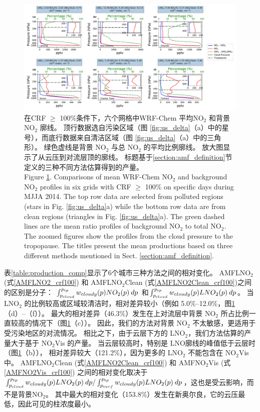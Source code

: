 \begin{figure}[!htbp]
\includegraphics[width=15cm]{./figures/us_bkgd_comp.pdf}
\caption{在CRF $\geq$ 100\%条件下，六个网格中WRF-Chem 平均NO$_\textrm{2}$ 和背景 NO$_\textrm{2}$ 廓线。
顶行数据选自污染区域（图 \ref{fig:us_delta}（a）中的星号），而底行数据来自清洁区域（图 \ref{fig:us_delta}（a）中的三角形）。
绿色虚线是背景 NO$_\textrm{2}$ 与总 NO$_\textrm{2}$ 的平均比例廓线。
放大图显示了从云压到对流层顶的廓线。
标题基于\ref{section:amf_definition}节定义的三种不同方法估算得到的产量。\\
Figure \ref{fig:us_bkgd_comp}. Comparisons of mean WRF-Chem NO$_\textrm{2}$ and background NO$_\textrm{2}$ profiles in six grids with CRF $\geq$ 100\% on specific days during MJJA 2014.
The top row data are selected from polluted regions (stars in Fig. \ref{fig:us_delta}a) while the bottom row data are from clean regions (triangles in Fig. \ref{fig:us_delta}a).
The green dashed lines are the mean ratio profiles of background NO$_\textrm{2}$ to total NO$_\textrm{2}$.
The zoomed figures show the profiles from the cloud pressure to the tropopause.
The titles present the mean productions based on three different methods mentioned in Sect. \ref{section:amf_definition}.}
\label{fig:us_bkgd_comp}
\end{figure}


表\ref{table:production_comp}显示了6个城市三种方法之间的相对变化。
AMFLNO$_2$ (式\ref{AMFLNO2_crf100}) 和 AMFLNO$_2$Clean (式\ref{AMFLNO2Clean_crf100})之间的区别是分子：
$\int_{p_{\textrm cloud}}^{p_{\textrm tp}} w_{\textrm cloudy}(p) NO_2(p) \: dp$
和$\int_{p_{\textrm cloud}}^{p_{\textrm tp}} w_{\textrm cloudy}(p) LNO_2(p) \: dp$。
当 LNO$_2$ 的比例较高或区域较清洁时，相对差异较小（例如 5.0\%--12.0\%，图\ref{fig:us_bkgd_comp}（d）--（f））。
最大的相对差异（46.3\%）发生在上对流层中背景 NO$_2$ 所占比例一直较高的情况下（图\ref{fig:us_bkgd_comp}（c））。
因此，我们的方法对背景 NO$_2$ 不太敏感，更适用于受污染地区的对流情况。
相比之下，由于云层下方的 LNO$_2$，我们方法估算的产量大于基于 NO$_2$Vis 的产量。
当云层较高时，特别是 LNO廓线的峰值低于云层时（图\ref{fig:us_bkgd_comp}（b）），
相对差异较大（121.2\%），因为更多的 LNO$_2$ 不能包含在 NO$_2$Vis 中。
AMFLNO$_2$Clean (式\ref{AMFLNO2Clean_crf100}) 和 AMFNO$_2$Vis (式\ref{AMFNO2Vis_crf100}) 之间的相对变化取决于
$\int_{p_{\textrm cloud}}^{p_{\textrm tp}} w_{\textrm cloudy}(p) LNO_2(p) \: dp / \int_{p_{\textrm surf}}^{p_{\textrm tp}} w_{\textrm cloudy}(p) LNO_2(p) \: dp$，这也是受云影响，而不是背景NO$_2$。
其中最大的相对变化（153.8\%）发生在新奥尔良，它的云压最低，因此可见的柱浓度最小。


